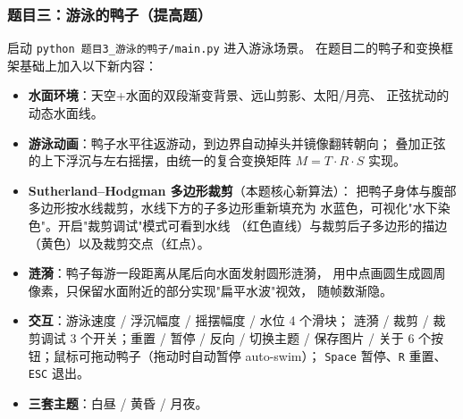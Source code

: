 \documentclass[12pt, a4paper]{article}
\begin{document}
\subsubsection*{题目三：游泳的鸭子（提高题）}
启动 \texttt{python 题目3\_游泳的鸭子/main.py} 进入游泳场景。
在题目二的鸭子和变换框架基础上加入以下新内容：
\begin{itemize}[leftmargin=*]
    \item \textbf{水面环境}：天空+水面的双段渐变背景、远山剪影、太阳/月亮、
    正弦扰动的动态水面线。
    \item \textbf{游泳动画}：鸭子水平往返游动，到边界自动掉头并镜像翻转朝向；
    叠加正弦的上下浮沉与左右摇摆，由统一的复合变换矩阵
    $M = T \cdot R \cdot S$ 实现。
    \item \textbf{Sutherland--Hodgman 多边形裁剪}（本题核心新算法）：
    把鸭子身体与腹部多边形按水线裁剪，水线下方的子多边形重新填充为
    水蓝色，可视化"水下染色"。开启"裁剪调试"模式可看到水线
    （红色直线）与裁剪后子多边形的描边（黄色）以及裁剪交点（红点）。
    \item \textbf{涟漪}：鸭子每游一段距离从尾后向水面发射圆形涟漪，
    用中点画圆生成圆周像素，只保留水面附近的部分实现"扁平水波"视效，
    随帧数渐隐。
    \item \textbf{交互}：游泳速度 / 浮沉幅度 / 摇摆幅度 / 水位 4 个滑块；
    涟漪 / 裁剪 / 裁剪调试 3 个开关；重置 / 暂停 / 反向 / 切换主题 /
    保存图片 / 关于 6 个按钮；鼠标可拖动鸭子（拖动时自动暂停 auto-swim）；
    \texttt{Space} 暂停、\texttt{R} 重置、\texttt{ESC} 退出。
    \item \textbf{三套主题}：白昼 / 黄昏 / 月夜。
\end{itemize}
\end{document}
